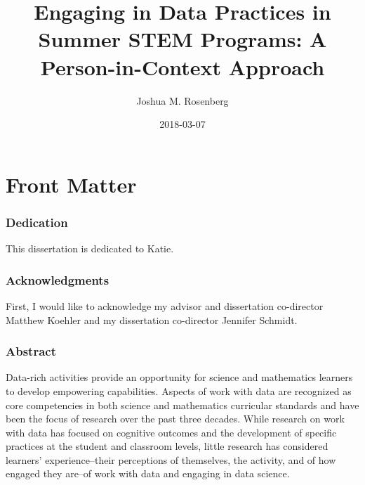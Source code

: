 \documentclass[]{book}
\title{Engaging in Data Practices in Summer STEM Programs: A Person-in-Context
Approach}
\author{Joshua M. Rosenberg}
\date{2018-03-07}
\theoremstyle{definition}
\theoremstyle{definition}
\theoremstyle{definition}
\theoremstyle{remark}
\begin{document}
\maketitle

{
\setcounter{tocdepth}{1}
\tableofcontents
}
\chapter{Front Matter}\label{front-matter}

\subsection{Dedication}\label{dedication}

This dissertation is dedicated to Katie.

\subsection{Acknowledgments}\label{acknowledgments}

First, I would like to acknowledge my advisor and dissertation
co-director Matthew Koehler and my dissertation co-director Jennifer
Schmidt.

\subsection{Abstract}\label{abstract}

Data-rich activities provide an opportunity for science and mathematics
learners to develop empowering capabilities. Aspects of work with data
are recognized as core competencies in both science and mathematics
curricular standards and have been the focus of research over the past
three decades. While research on work with data has focused on cognitive
outcomes and the development of specific practices at the student and
classroom levels, little research has considered learners'
experience--their perceptions of themselves, the activity, and of how
engaged they are--of work with data and engaging in data science.
\end{document}
